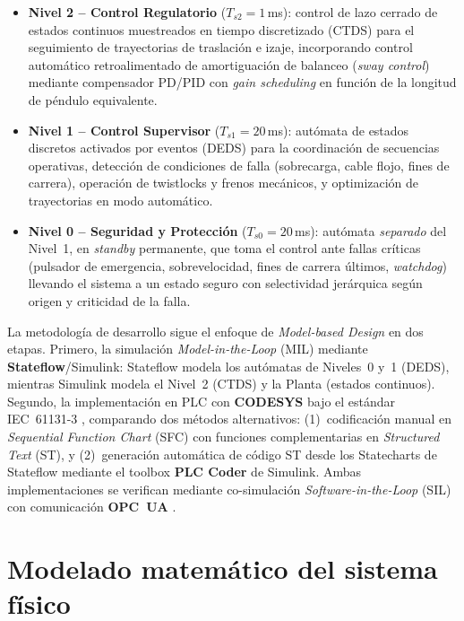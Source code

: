 \documentclass[12pt, a4paper]{article}
\begin{document}
\begin{itemize}
    \item \textbf{Nivel 2 -- Control Regulatorio} ($T_{s2} = 1$\,ms): control de lazo
    cerrado de estados continuos muestreados en tiempo discretizado (CTDS) para el
    seguimiento de trayectorias de traslación e izaje, incorporando control automático
    retroalimentado de amortiguación de balanceo (\textit{sway control}) mediante
    compensador PD/PID con \textit{gain scheduling} en función de la longitud de péndulo
    equivalente.

    \item \textbf{Nivel 1 -- Control Supervisor} ($T_{s1} = 20$\,ms): autómata de
    estados discretos activados por eventos (DEDS) para la coordinación de secuencias
    operativas, detección de condiciones de falla (sobrecarga, cable flojo, fines de
    carrera), operación de twistlocks y frenos mecánicos, y optimización de trayectorias
    en modo automático.

    \item \textbf{Nivel 0 -- Seguridad y Protección} ($T_{s0} = 20$\,ms): autómata
    \textit{separado} del Nivel~1, en \textit{standby} permanente, que toma el control
    ante fallas críticas (pulsador de emergencia, sobrevelocidad, fines de carrera
    últimos, \textit{watchdog}) llevando el sistema a un estado seguro con selectividad
    jerárquica según origen y criticidad de la falla.
\end{itemize}

La metodología de desarrollo sigue el enfoque de \textit{Model-based Design} en dos
etapas. Primero, la simulación \textit{Model-in-the-Loop} (MIL) mediante
\textbf{Stateflow}/Simulink: Stateflow modela los autómatas de Niveles~0 y~1 (DEDS),
mientras Simulink modela el Nivel~2 (CTDS) y la Planta (estados continuos). Segundo,
la implementación en PLC con \textbf{CODESYS} bajo el estándar IEC~61131-3 \cite{iec61131},
comparando dos métodos alternativos: (1)~codificación manual en \textit{Sequential
Function Chart} (SFC) con funciones complementarias en \textit{Structured Text} (ST),
y (2)~generación automática de código ST desde los Statecharts de Stateflow mediante el
toolbox \textbf{PLC Coder} de Simulink. Ambas implementaciones se verifican mediante
co-simulación \textit{Software-in-the-Loop} (SIL) con comunicación \textbf{OPC~UA}
\cite{opcua}.

\newpage
\section{Modelado matemático del sistema físico}
\end{document}
